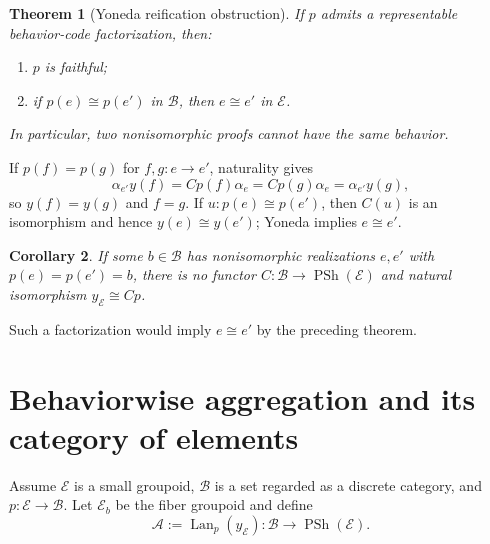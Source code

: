 \documentclass[12pt,a4paper,twoside]{extarticle}
\makeatletter
\theoremstyle{compactplain}
\newtheorem{theorem}{Theorem}[section]
\newtheorem{corollary}[theorem]{Corollary}
\theoremstyle{compactdef}
\renewenvironment{proof}[1][\proofname]{\par\pushQED{\qed}\normalfont
  \topsep2pt\trivlist\item[\hskip\labelsep\bfseries #1\@addpunct{.}]\ignorespaces}
 {\popQED\endtrivlist\@endpefalse}
\newcommand{\PSh}{\operatorname{PSh}}
\newcommand{\Lan}{\operatorname{Lan}}
\newcommand{\iso}{\cong}
\makeatother
\begin{document}
\begin{theorem}[Yoneda reification obstruction]
If $p$ admits a representable behavior-code factorization, then:
\begin{enumerate}[label=(\roman*)]
\item $p$ is faithful;
\item if $p(e)\iso p(e')$ in $\mathcal B$, then $e\iso e'$ in $\mathcal E$.
\end{enumerate}
In particular, two nonisomorphic proofs cannot have the same behavior.
\end{theorem}
\begin{proof}
If $p(f)=p(g)$ for $f,g:e\to e'$, naturality gives
\[
\alpha_{e'}y(f)=Cp(f)\alpha_e=Cp(g)\alpha_e=\alpha_{e'}y(g),
\]
so $y(f)=y(g)$ and $f=g$. If $u:p(e)\iso p(e')$, then $C(u)$ is an isomorphism and hence $y(e)\iso y(e')$; Yoneda implies $e\iso e'$.
\end{proof}

\begin{corollary}
If some $b\in\mathcal B$ has nonisomorphic realizations $e,e'$ with $p(e)=p(e')=b$, there is no functor $C:\mathcal B\to\PSh(\mathcal E)$ and natural isomorphism $y_{\mathcal E}\cong Cp$.
\end{corollary}
\begin{proof}
Such a factorization would imply $e\iso e'$ by the preceding theorem.
\end{proof}
\section{Behaviorwise aggregation and its category of elements}
Assume $\mathcal E$ is a small groupoid, $\mathcal B$ is a set regarded as a discrete category, and $p:\mathcal E\to\mathcal B$. Let $\mathcal E_b$ be the fiber groupoid and define
\[
\mathcal A:=\Lan_p(y_{\mathcal E}):\mathcal B\to\PSh(\mathcal E).
\]
\end{document}
